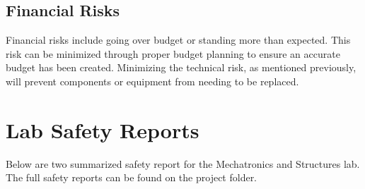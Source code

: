     \subsection{Financial Risks}
    Financial risks include going over budget or standing more than expected. This risk can be minimized through proper budget planning to ensure an accurate budget has been created. Minimizing the technical risk, as mentioned previously, will prevent components or equipment from needing to be replaced.
\vspace{-5mm}
\section{Lab Safety Reports}
    Below are two summarized safety report for the Mechatronics and Structures lab. The full safety reports can be found on the project folder.

            
